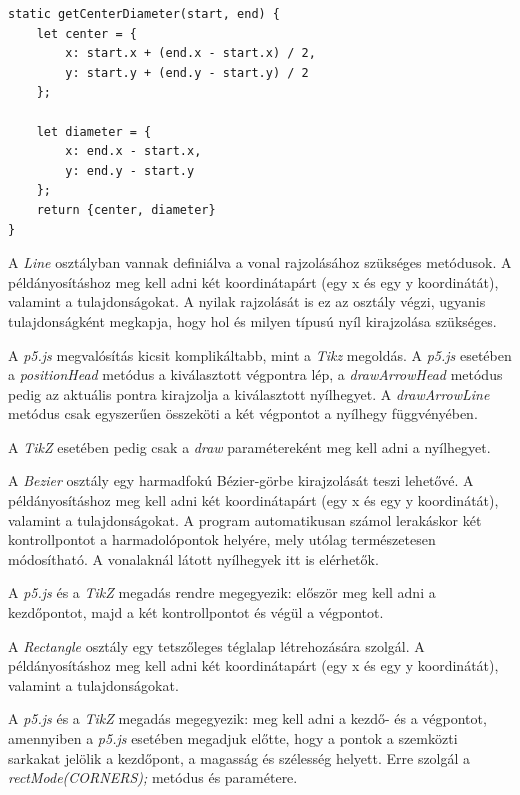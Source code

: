 \begin{lstlisting}[style=es6]
static getCenterDiameter(start, end) {
	let center = {
		x: start.x + (end.x - start.x) / 2,
		y: start.y + (end.y - start.y) / 2
	};

	let diameter = {
		x: end.x - start.x,
		y: end.y - start.y
	};
	return {center, diameter}
}
\end{lstlisting}


A \textit{Line} osztályban vannak definiálva a vonal rajzolásához szükséges metódusok. A példányosításhoz meg kell adni két koordinátapárt (egy x és egy y koordinátát), valamint a tulajdonságokat. A nyilak rajzolását is ez az osztály végzi, ugyanis tulajdonságként megkapja, hogy hol és milyen típusú nyíl kirajzolása szükséges. 

A \textit{p5.js} megvalósítás kicsit komplikáltabb, mint a \textit{Tikz} megoldás. A \textit{p5.js} esetében a \textit{positionHead} metódus a kiválasztott végpontra lép, a \textit{drawArrowHead} metódus pedig az aktuális pontra kirajzolja a kiválasztott nyílhegyet. A \textit{drawArrowLine} metódus csak egyszerűen összeköti a két végpontot a nyílhegy függvényében.

A \textit{TikZ} esetében pedig csak a \textit{draw} paramétereként meg kell adni a nyílhegyet.


A \textit{Bezier} osztály egy harmadfokú Bézier-görbe kirajzolását teszi lehetővé. A példányosításhoz meg kell adni két koordinátapárt (egy x és egy y koordinátát), valamint a tulajdonságokat. A program automatikusan számol lerakáskor két kontrollpontot a harmadolópontok helyére, mely utólag természetesen módosítható. A vonalaknál látott nyílhegyek itt is elérhetők.

A \textit{p5.js} és a \textit{TikZ} megadás rendre megegyezik: először meg kell adni a kezdőpontot, majd a két kontrollpontot és végül a végpontot.


A \textit{Rectangle} osztály egy tetszőleges téglalap létrehozására szolgál. A példányosításhoz meg kell adni két koordinátapárt (egy x és egy y koordinátát), valamint a tulajdonságokat. 

A \textit{p5.js} és a \textit{TikZ} megadás megegyezik: meg kell adni a kezdő- és a végpontot, amennyiben a \textit{p5.js} esetében megadjuk előtte, hogy a pontok a szemközti sarkakat jelölik a kezdőpont, a magasság és szélesség helyett. Erre szolgál a \textit{rectMode(CORNERS);} metódus és paramétere.


